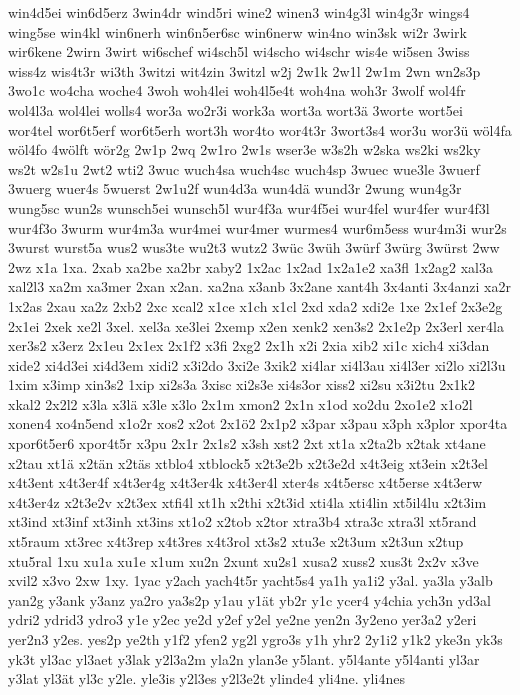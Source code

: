 {win4d5ei
win6d5erz
3win4dr
wind5ri
wine2
winen3
win4g3l
win4g3r
wings4
wing5se
win4kl
win6nerh
win6n5er6sc
win6nerw
win4no
win3sk
wi2r
3wirk
wir6kene
2wirn
3wirt
wi6schef
wi4sch5l
wi4scho
wi4schr
wis4e
wi5sen
3wiss
wiss4z
wis4t3r
wi3th
3witzi
wit4zin
3witzl
w2j
2w1k
2w1l
2w1m
2wn
wn2s3p
3wo1c
wo4cha
woche4
3woh
woh4lei
woh4l5e4t
woh4na
woh3r
3wolf
wol4fr
wol4l3a
wol4lei
wolls4
wor3a
wo2r3i
work3a
wort3a
wort3ä
3worte
wort5ei
wor4tel
wor6t5erf
wor6t5erh
wort3h
wor4to
wor4t3r
3wort3s4
wor3u
wor3ü
wöl4fa
wöl4fo
4wölft
wör2g
2w1p
2wq
2w1ro
2w1s
wser3e
w3s2h
w2ska
ws2ki
ws2ky
ws2t
w2s1u
2wt2
wti2
3wuc
wuch4sa
wuch4sc
wuch4sp
3wuec
wue3le
3wuerf
3wuerg
wuer4s
5wuerst
2w1u2f
wun4d3a
wun4dä
wund3r
2wung
wun4g3r
wung5sc
wun2s
wunsch5ei
wunsch5l
wur4f3a
wur4f5ei
wur4fel
wur4fer
wur4f3l
wur4f3o
3wurm
wur4m3a
wur4mei
wur4mer
wurmes4
wur6m5ess
wur4m3i
wur2s
3wurst
wurst5a
wus2
wus3te
wu2t3
wutz2
3wüc
3wüh
3würf
3würg
3würst
2ww
2wz
x1a
1xa.
2xab
xa2be
xa2br
xaby2
1x2ac
1x2ad
1x2a1e2
xa3fl
1x2ag2
xal3a
xal2l3
xa2m
xa3mer
2xan
x2an.
xa2na
x3anb
3x2ane
xant4h
3x4anti
3x4anzi
xa2r
1x2as
2xau
xa2z
2xb2
2xc
xcal2
x1ce
x1ch
x1cl
2xd
xda2
xdi2e
1xe
2x1ef
2x3e2g
2x1ei
2xek
xe2l
3xel.
xel3a
xe3lei
2xemp
x2en
xenk2
xen3s2
2x1e2p
2x3erl
xer4la
xer3s2
x3erz
2x1eu
2x1ex
2x1f2
x3fi
2xg2
2x1h
x2i
2xia
xib2
xi1c
xich4
xi3dan
xide2
xi4d3ei
xi4d3em
xidi2
x3i2do
3xi2e
3xik2
xi4lar
xi4l3au
xi4l3er
xi2lo
xi2l3u
1xim
x3imp
xin3s2
1xip
xi2s3a
3xisc
xi2s3e
xi4s3or
xiss2
xi2su
x3i2tu
2x1k2
xkal2
2x2l2
x3la
x3lä
x3le
x3lo
2x1m
xmon2
2x1n
x1od
xo2du
2xo1e2
x1o2l
xonen4
xo4n5end
x1o2r
xos2
x2ot
2x1ö2
2x1p2
x3par
x3pau
x3ph
x3plor
xpor4ta
xpor6t5er6
xpor4t5r
x3pu
2x1r
2x1s2
x3sh
xst2
2xt
xt1a
x2ta2b
x2tak
xt4ane
x2tau
xt1ä
x2tän
x2täs
xtblo4
xtblock5
x2t3e2b
x2t3e2d
x4t3eig
xt3ein
x2t3el
x4t3ent
x4t3er4f
x4t3er4g
x4t3er4k
x4t3er4l
xter4s
x4t5ersc
x4t5erse
x4t3erw
x4t3er4z
x2t3e2v
x2t3ex
xtfi4l
xt1h
x2thi
x2t3id
xti4la
xti4lin
xt5il4lu
x2t3im
xt3ind
xt3inf
xt3inh
xt3ins
xt1o2
x2tob
x2tor
xtra3b4
xtra3c
xtra3l
xt5rand
xt5raum
xt3rec
x4t3rep
x4t3res
x4t3rol
xt3s2
xtu3e
x2t3um
x2t3un
x2tup
xtu5ral
1xu
xu1a
xu1e
x1um
xu2n
2xunt
xu2s1
xusa2
xuss2
xus3t
2x2v
x3ve
xvil2
x3vo
2xw
1xy.
1yac
y2ach
yach4t5r
yacht5s4
ya1h
ya1i2
y3al.
ya3la
y3alb
yan2g
y3ank
y3anz
ya2ro
ya3s2p
y1au
y1ät
yb2r
y1c
ycer4
y4chia
ych3n
yd3al
ydri2
ydrid3
ydro3
y1e
y2ec
ye2d
y2ef
y2el
ye2ne
yen2n
3y2eno
yer3a2
y2eri
yer2n3
y2es.
yes2p
ye2th
y1f2
yfen2
yg2l
ygro3s
y1h
yhr2
2y1i2
y1k2
yke3n
yk3s
yk3t
yl3ac
yl3aet
y3lak
y2l3a2m
yla2n
ylan3e
y5lant.
y5l4ante
y5l4anti
yl3ar
y3lat
yl3ät
yl3c
y2le.
yle3is
y2l3es
y2l3e2t
ylinde4
yli4ne.
yli4nes
}
